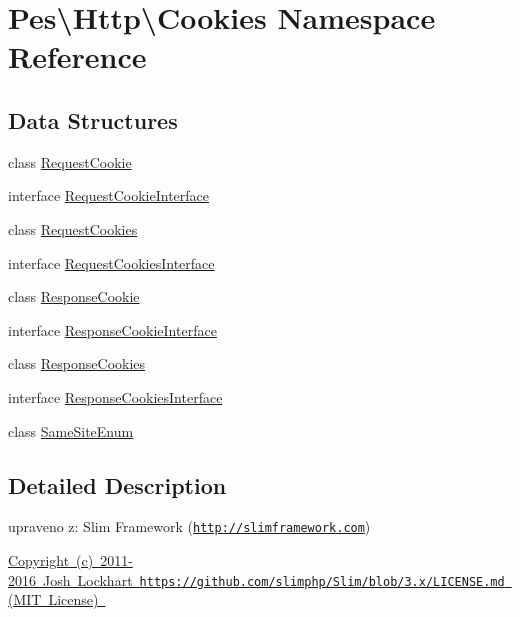 \hypertarget{namespace_pes_1_1_http_1_1_cookies}{}\section{Pes\textbackslash{}Http\textbackslash{}Cookies Namespace Reference}
\label{namespace_pes_1_1_http_1_1_cookies}
\subsection*{Data Structures}
\begin{DoxyCompactItemize}
\item 
class \mbox{\hyperlink{class_pes_1_1_http_1_1_cookies_1_1_request_cookie}{Request\+Cookie}}
\item 
interface \mbox{\hyperlink{interface_pes_1_1_http_1_1_cookies_1_1_request_cookie_interface}{Request\+Cookie\+Interface}}
\item 
class \mbox{\hyperlink{class_pes_1_1_http_1_1_cookies_1_1_request_cookies}{Request\+Cookies}}
\item 
interface \mbox{\hyperlink{interface_pes_1_1_http_1_1_cookies_1_1_request_cookies_interface}{Request\+Cookies\+Interface}}
\item 
class \mbox{\hyperlink{class_pes_1_1_http_1_1_cookies_1_1_response_cookie}{Response\+Cookie}}
\item 
interface \mbox{\hyperlink{interface_pes_1_1_http_1_1_cookies_1_1_response_cookie_interface}{Response\+Cookie\+Interface}}
\item 
class \mbox{\hyperlink{class_pes_1_1_http_1_1_cookies_1_1_response_cookies}{Response\+Cookies}}
\item 
interface \mbox{\hyperlink{interface_pes_1_1_http_1_1_cookies_1_1_response_cookies_interface}{Response\+Cookies\+Interface}}
\item 
class \mbox{\hyperlink{class_pes_1_1_http_1_1_cookies_1_1_same_site_enum}{Same\+Site\+Enum}}
\end{DoxyCompactItemize}


\subsection{Detailed Description}
upraveno z\+: Slim Framework (\href{http://slimframework.com}{\tt http\+://slimframework.\+com})

\mbox{\hyperlink{}{Copyright (c) 2011-\/2016 Josh Lockhart  \href{https://github.com/slimphp/Slim/blob/3.x/LICENSE.md}{\tt https\+://github.\+com/slimphp/\+Slim/blob/3.\+x/\+L\+I\+C\+E\+N\+S\+E.\+md} (M\+IT License) }}